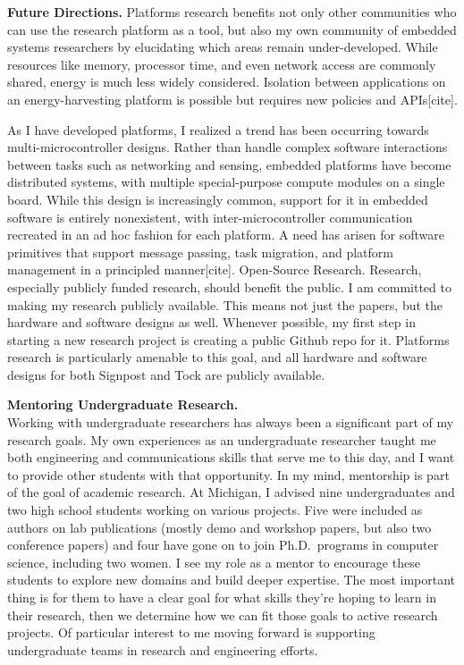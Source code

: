 \documentclass[11pt]{article} %
\begin{document}
\textbf{Future Directions.} Platforms research benefits not only other communities who
can use the research platform as a tool, but also my own community of embedded
systems researchers by elucidating which areas remain under-developed. While
resources like memory, processor time, and even network access are commonly
shared, energy is much less widely considered. Isolation between applications
on an energy-harvesting platform is possible but requires new policies and
APIs[cite].

As I have developed platforms, I realized a trend has been occurring towards
multi-microcontroller designs. Rather than handle complex software interactions
between tasks such as networking and sensing, embedded platforms have become
distributed systems, with multiple special-purpose compute modules on a single
board. While this design is increasingly common, support for it in embedded
software is entirely nonexistent, with inter-microcontroller communication
recreated in an ad hoc fashion for each platform. A need has arisen for
software primitives that support message passing, task migration, and platform
management in a principled manner[cite]. Open-Source Research. Research,
especially publicly funded research, should benefit the public. I am committed
to making my research publicly available. This means not just the papers, but
the hardware and software designs as well. Whenever possible, my first step in
starting a new research project is creating a public Github repo for it.
Platforms research is particularly amenable to this goal, and all hardware and
software designs for both Signpost and Tock are publicly available.

\textbf{\textsf{\large Mentoring Undergraduate Research.}}\\
Working with undergraduate researchers has always been a significant part of my
research goals. My own experiences as an undergraduate researcher taught me
both engineering and communications skills that serve me to this day, and I
want to provide other students with that opportunity. In my mind, mentorship is
part of the goal of academic research. At Michigan, I advised nine
undergraduates and two high school students working on various projects. Five
were included as authors on lab publications (mostly demo and workshop papers,
but also two conference papers) and four have gone on to join Ph.D.\ programs in
computer science, including two women. I see my role as a mentor to encourage
these students to explore new domains and build deeper expertise. The most
important thing is for them to have a clear goal for what skills they're hoping
to learn in their research, then we determine how we can fit those goals to
active research projects. Of particular interest to me moving forward is
supporting undergraduate teams in research and engineering efforts.
\end{document}

